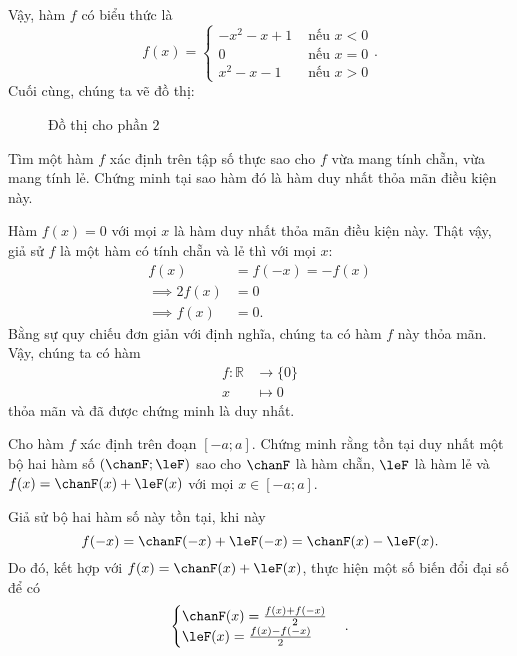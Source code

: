 Vậy, hàm $f$ có biểu thức là
$$
   f(x) = \begin{cases}
      -x^2 - x + 1 & \text{ nếu } x < 0 \\
      0 & \text{ nếu } x = 0 \\
      x^2 - x - 1 & \text{ nếu } x > 0
   \end{cases}.
$$
Cuối cùng, chúng ta vẽ đồ thị:
\begin{figure}[H]
	\centering
	\caption{Đồ thị cho phần $2$}
\end{figure}

\exercise Tìm một hàm $f$ xác định trên tập số thực sao cho $f$ vừa mang tính chẵn, vừa mang tính lẻ. Chứng minh tại sao hàm đó là hàm duy nhất thỏa mãn điều kiện này.

\solution 

Hàm $f(x) = 0$ với mọi $x$ là hàm duy nhất thỏa mãn điều kiện này. Thật vậy, giả sử $f$ là một hàm có tính chẵn và lẻ thì với mọi $x$: 
\begin{align*}
   f(x) &= f(-x) = -f(x) \\
   \implies 2f(x) &= 0 \\
   \implies f(x) &= 0.
\end{align*}
Bằng sự quy chiếu đơn giản với định nghĩa, chúng ta có hàm $f$ này thỏa mãn. Vậy, chúng ta có hàm \begin{align*}
   f: \mathbb{R} &\to \{0\} \\
         x &\mapsto 0
\end{align*} thỏa mãn và đã được chứng minh là duy nhất.

\exercise Cho hàm $f$ xác định trên đoạn $[-a; a]$. Chứng minh rằng tồn tại duy nhất một bộ hai hàm số $\left(\chanF; \leF\right)$ sao cho $\chanF$ là hàm chẵn, $\leF$ là hàm lẻ và $f(x) = \chanF(x) + \leF(x)$ với mọi $x \in [-a; a]$.

\solution

Giả sử bộ hai hàm số này tồn tại, khi này
$$
f(-x) = \chanF(-x) + \leF(-x) = \chanF(x) - \leF(x).
$$
Do đó, kết hợp với $f(x) = \chanF(x) + \leF(x)$, thực hiện một số biến đổi đại số để có \begin{equation*}
   \begin{cases}
      \chanF(x) = \frac{f(x) + f(-x)}{2} \\
      \leF(x) = \frac{f(x) - f(-x)}{2}
   \end{cases}.
\end{equation*}

